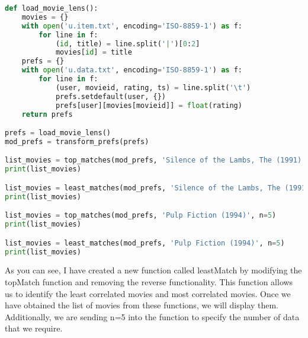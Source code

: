 \documentclass[12pt]{article}
\begin{document}
\begin{lstlisting}[language=Python, caption=Further tweet analysis]
def load_movie_lens():
    movies = {}
    with open('u.item.txt', encoding='ISO-8859-1') as f:
        for line in f:
            (id, title) = line.split('|')[0:2]
            movies[id] = title
    prefs = {}
    with open('u.data.txt', encoding='ISO-8859-1') as f:
        for line in f:
            (user, movieid, rating, ts) = line.split('\t')
            prefs.setdefault(user, {})
            prefs[user][movies[movieid]] = float(rating)
    return prefs

prefs = load_movie_lens()
mod_prefs = transform_prefs(prefs)

list_movies = top_matches(mod_prefs, 'Silence of the Lambs, The (1991)', n=5)
print(list_movies)

list_movies = least_matches(mod_prefs, 'Silence of the Lambs, The (1991)', n=5)
print(list_movies)

list_movies = top_matches(mod_prefs, 'Pulp Fiction (1994)', n=5)
print(list_movies)

list_movies = least_matches(mod_prefs, 'Pulp Fiction (1994)', n=5)
print(list_movies)

\end{lstlisting}

As you can see, I have created a new function called leastMatch by modifying the topMatch function and removing the reverse functionality. This function allows us to identify the least correlated movies and most correlated movies. Once we have obtained the list of movies from these functions, we will display them. Additionally, we are sending n=5 into the function to specify the number of data that we require.
\end{document}

